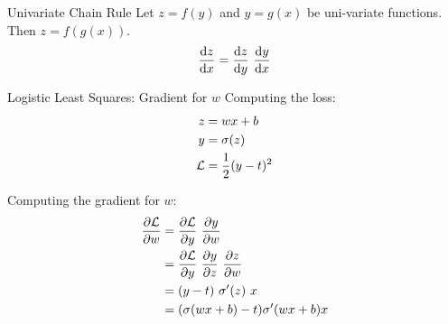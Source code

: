 \documentclass[handout,aspectratio=169]{beamer}
\begin{document}
%
%


\begin{frame}{Univariate Chain Rule}
Let $z = f(y)$ and $y = g(x)$ be uni-variate functions. \\
Then $z = f(g(x))$.
\begin{align*}
\frac{\mathrm{d} z}{\mathrm{d} x} = \frac{\mathrm{d} z}{\mathrm{d} y} \,\, \frac{\mathrm{d} y}{\mathrm{d} x}
\end{align*}
\end{frame}


\begin{frame}{Logistic Least Squares: Gradient for $w$}
  Computing the loss:
  \begin{align*}
    \Large
    z &= w x + b \\
    y &= \sigma(z) \\
    {\cal L} &= \frac{1}{2} (y - t)^2 
  \end{align*}

Computing the gradient for $w$:
\begin{align*}
    \frac{\partial {\cal L}}{\partial w} 
    &= \frac{\partial {\cal L}}{\partial y} \,\, \frac{\partial y}{\partial w}  \\
    &= \frac{\partial {\cal L}}{\partial y} \,\, \frac{\partial y}{\partial z} \,\, \frac{\partial z}{\partial w}  \\
            &= (y - t) \,\, \sigma^\prime (z) \,\, x \\
            &= (\sigma(w x + b) - t) \sigma^\prime (w x + b) x
\end{align*}
\end{frame}
\end{document}
